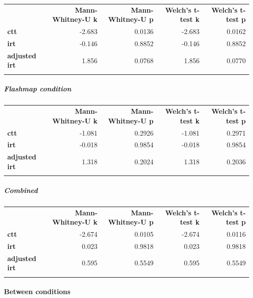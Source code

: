\documentclass[]{article}
\begin{document}
\begin{longtable}[c]{@{}lrrrr@{}}
\toprule\addlinespace
& \textbf{Mann-Whitney-U k} & \textbf{Mann-Whitney-U p} &
\textbf{Welch's t-test k} & \textbf{Welch's t-test p}
\\\addlinespace
\midrule\endhead
\textbf{ctt} & -2.683 & 0.0136 & -2.683 & 0.0162
\\\addlinespace
\textbf{irt} & -0.146 & 0.8852 & -0.146 & 0.8852
\\\addlinespace
\textbf{adjusted irt} & 1.856 & 0.0768 & 1.856 & 0.0770
\\\addlinespace
\bottomrule
\end{longtable}

\FloatBarrier
\subparagraph{Flashmap condition}\label{flashmap-condition-1}

\begin{longtable}[c]{@{}lrrrr@{}}
\toprule\addlinespace
& \textbf{Mann-Whitney-U k} & \textbf{Mann-Whitney-U p} &
\textbf{Welch's t-test k} & \textbf{Welch's t-test p}
\\\addlinespace
\midrule\endhead
\textbf{ctt} & -1.081 & 0.2926 & -1.081 & 0.2971
\\\addlinespace
\textbf{irt} & -0.018 & 0.9854 & -0.018 & 0.9854
\\\addlinespace
\textbf{adjusted irt} & 1.318 & 0.2024 & 1.318 & 0.2036
\\\addlinespace
\bottomrule
\end{longtable}

\FloatBarrier
\subparagraph{Combined}\label{combined-1}

\begin{longtable}[c]{@{}lrrrr@{}}
\toprule\addlinespace
& \textbf{Mann-Whitney-U k} & \textbf{Mann-Whitney-U p} &
\textbf{Welch's t-test k} & \textbf{Welch's t-test p}
\\\addlinespace
\midrule\endhead
\textbf{ctt} & -2.674 & 0.0105 & -2.674 & 0.0116
\\\addlinespace
\textbf{irt} & 0.023 & 0.9818 & 0.023 & 0.9818
\\\addlinespace
\textbf{adjusted irt} & 0.595 & 0.5549 & 0.595 & 0.5549
\\\addlinespace
\bottomrule
\end{longtable}

\FloatBarrier
\paragraph{Between conditions}\label{between-conditions-1}
\end{document}
